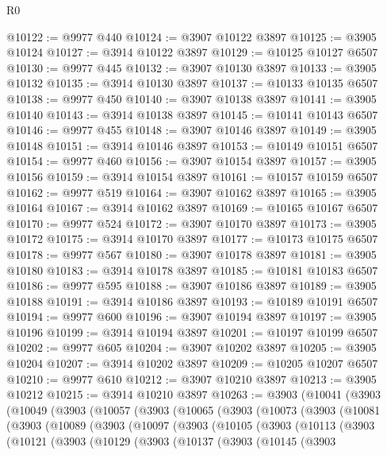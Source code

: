 \begin{lexlean}{R0}
\begin{coremodule}
@10122 := @9977 @440
@10124 := @3907 @10122 @3897
@10125 := @3905 @10124
@10127 := @3914 @10122 @3897
@10129 := @10125 @10127 @6507
@10130 := @9977 @445
@10132 := @3907 @10130 @3897
@10133 := @3905 @10132
@10135 := @3914 @10130 @3897
@10137 := @10133 @10135 @6507
@10138 := @9977 @450
@10140 := @3907 @10138 @3897
@10141 := @3905 @10140
@10143 := @3914 @10138 @3897
@10145 := @10141 @10143 @6507
@10146 := @9977 @455
@10148 := @3907 @10146 @3897
@10149 := @3905 @10148
@10151 := @3914 @10146 @3897
@10153 := @10149 @10151 @6507
@10154 := @9977 @460
@10156 := @3907 @10154 @3897
@10157 := @3905 @10156
@10159 := @3914 @10154 @3897
@10161 := @10157 @10159 @6507
@10162 := @9977 @519
@10164 := @3907 @10162 @3897
@10165 := @3905 @10164
@10167 := @3914 @10162 @3897
@10169 := @10165 @10167 @6507
@10170 := @9977 @524
@10172 := @3907 @10170 @3897
@10173 := @3905 @10172
@10175 := @3914 @10170 @3897
@10177 := @10173 @10175 @6507
@10178 := @9977 @567
@10180 := @3907 @10178 @3897
@10181 := @3905 @10180
@10183 := @3914 @10178 @3897
@10185 := @10181 @10183 @6507
@10186 := @9977 @595
@10188 := @3907 @10186 @3897
@10189 := @3905 @10188
@10191 := @3914 @10186 @3897
@10193 := @10189 @10191 @6507
@10194 := @9977 @600
@10196 := @3907 @10194 @3897
@10197 := @3905 @10196
@10199 := @3914 @10194 @3897
@10201 := @10197 @10199 @6507
@10202 := @9977 @605
@10204 := @3907 @10202 @3897
@10205 := @3905 @10204
@10207 := @3914 @10202 @3897
@10209 := @10205 @10207 @6507
@10210 := @9977 @610
@10212 := @3907 @10210 @3897
@10213 := @3905 @10212
@10215 := @3914 @10210 @3897
@10263 := @3903
    (@10041
      (@3903
        (@10049
          (@3903
            (@10057
              (@3903
                (@10065
                  (@3903
                    (@10073
                      (@3903
                        (@10081
                          (@3903
                            (@10089
                              (@3903
                                (@10097
                                  (@3903
                                    (@10105
                                      (@3903
                                        (@10113
                                          (@3903
                                            (@10121
                                              (@3903
                                                (@10129
                                                  (@3903
                                                    (@10137
                                                      (@3903
                                                        (@10145
                                                          (@3903

\end{coremodule}
\end{lexlean}
